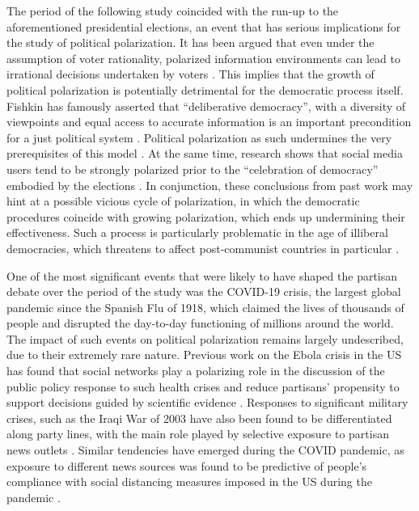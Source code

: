 \documentclass{article}
\begin{document}
	The period of the following study coincided with the run-up to the aforementioned presidential elections, an event that has serious implications for the study of political polarization. It has been argued that even under the assumption of voter rationality, polarized information environments can lead to irrational decisions undertaken by voters \citep{bernhardt2008}. This implies that the growth of political polarization is potentially detrimental for the democratic process itself. Fishkin has famously asserted that “deliberative democracy”, with a diversity of viewpoints and equal access to accurate information is an important precondition for a just political system \citep{fishkin2009}. Political polarization as such undermines the very prerequisites of this model \citep{sunstein2002}. At the same time, research shows that social media users tend to be strongly polarized prior to the “celebration of democracy” embodied by the elections \citep{conover2011, grover2019}. In conjunction, these conclusions from past work may hint at a possible vicious cycle of polarization, in which the democratic procedures coincide with growing polarization, which ends up undermining their effectiveness. Such a process is particularly problematic in the age of illiberal democracies, which threatens to affect post-communist countries in particular \citep{zakaria1997}.
	
	One of the most significant events that were likely to have shaped the partisan debate over the period of the study was the COVID-19 crisis, the largest global pandemic since the Spanish Flu of 1918, which claimed the lives of thousands of people and disrupted the day-to-day functioning of millions around the world. The impact of such events on political polarization remains largely undescribed, due to their extremely rare nature. Previous work on the Ebola crisis in the US has found that social networks play a polarizing role in the discussion of the public policy response to such health crises and reduce partisans’ propensity to support decisions guided by scientific evidence \citep{elmedni2016}. Responses to significant military crises, such as the Iraqi War of 2003 have also been found to be differentiated along party lines, with the main role played by selective exposure to partisan news outlets \citep{jacobson2010}. Similar tendencies have emerged during the COVID pandemic, as exposure to different news sources was found to be predictive of people’s compliance with social distancing measures imposed in the US during the pandemic \citep{bursztyn2020}. 
	
\end{document}
